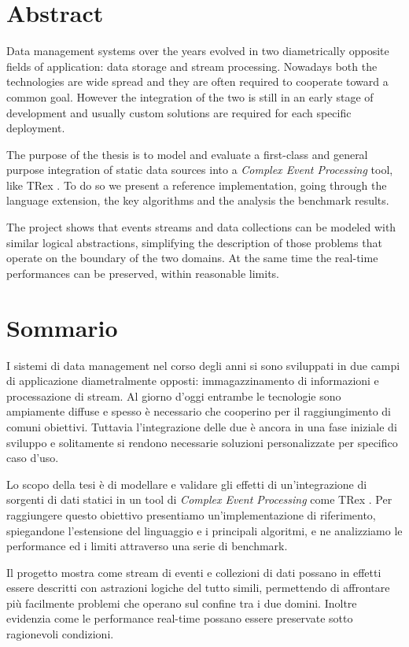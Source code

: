 \chapter*{Abstract}

Data management systems over the years evolved in two diametrically opposite fields of application: data storage and stream processing. Nowadays both the technologies are wide spread and they are often required to cooperate toward a common goal. However the integration of the two is still in an early stage of development and usually custom solutions are required for each specific deployment.

The purpose of the thesis is to model and evaluate a first-class and general purpose integration of static data sources into a \emph{Complex Event Processing} tool, like TRex \cite{trex}. To do so we present a reference implementation, going through the language extension, the key algorithms and the analysis the benchmark results.

The project shows that events streams and data collections can be modeled with similar logical abstractions, simplifying the description of those problems that operate on the boundary of the two domains. At the same time the real-time performances can be preserved, within reasonable limits.

\chapter*{Sommario}
I sistemi di data management nel corso degli anni si sono sviluppati in due campi di applicazione diametralmente opposti: immagazzinamento di informazioni e processazione di stream. Al giorno d'oggi entrambe le tecnologie sono ampiamente diffuse e spesso è necessario che cooperino per il raggiungimento di comuni obiettivi. Tuttavia l'integrazione delle due è ancora in una fase iniziale di sviluppo e solitamente si rendono necessarie soluzioni personalizzate per specifico caso d'uso.

Lo scopo della tesi è di modellare e validare gli effetti di un'in\-te\-gra\-zio\-ne di sorgenti di dati statici in un tool di \emph{Complex Event Processing} come TRex \cite{trex}. Per raggiungere questo obiettivo presentiamo un'implementazione di riferimento, spiegandone l'estensione del linguaggio e i principali algoritmi, e ne analizziamo le performance ed i limiti attraverso una serie di benchmark.

Il progetto mostra come stream di eventi e collezioni di dati possano in effetti essere descritti con astrazioni logiche del tutto simili, permettendo di affrontare più facilmente problemi che operano sul confine tra i due domini. Inoltre evidenzia come le performance real-time possano essere preservate sotto ragionevoli condizioni.
